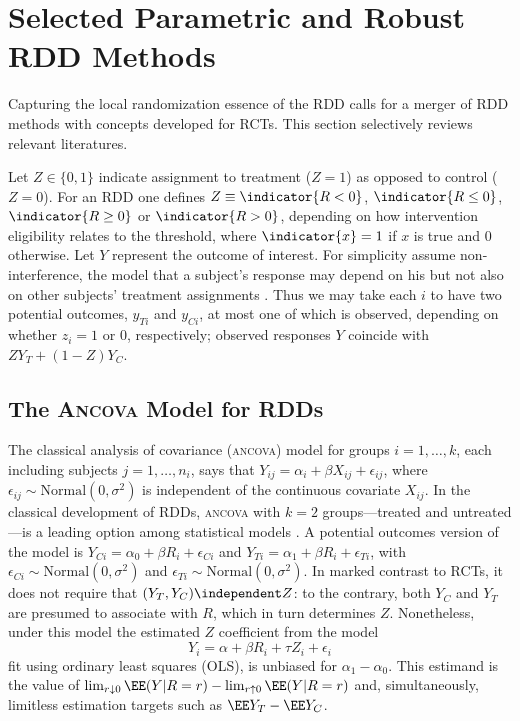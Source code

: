 \section{Selected Parametric and Robust RDD Methods}
Capturing the local randomization essence of the RDD calls for
a merger of RDD methods with concepts developed for RCTs. This
section selectively reviews relevant literatures.

Let $Z \in \{0,1\}$ indicate assignment to treatment ($Z=1$) as opposed to control
($Z=0$).  For an RDD one defines $Z \equiv \indicator{R< 0}$,
$\indicator{R \leq 0}$, $\indicator{R\geq 0}$ or $\indicator{R > 0}$,
depending on how intervention eligibility relates to the threshold,
where $\indicator{x}=1$ if $x$ is true and $0$ otherwise.
Let $Y$ represent the outcome of interest.
For simplicity assume non-interference, the model that
a subject's response may depend on his but not also on other subjects'
treatment assignments \citep{cox:1958,rubin:1978}.  Thus we may take each $i$
to have two potential outcomes, $y_{Ti}$ and $y_{Ci}$, at most one of which is observed, depending on whether $z_i=1$ or $0$, respectively;
 observed
responses $Y$ coincide with $ZY_{T}+(1-Z)Y_{C}$.

\subsection{The \textsc{Ancova} Model for RDDs}\label{sec:robust-analys-covar}

The classical analysis of covariance (\textsc{ancova}) model for
groups $i=1,\ldots, k$, each including subjects $j=1, \ldots, n_{i}$,
says that
$Y_{ij} = \alpha_{i} + \beta X_{ij} + \epsilon_{ij}$, where $\epsilon_{ij}
\sim \mathrm{Normal}(0, \sigma^{2})$ is independent of the continuous
covariate $X_{ij}$.
In the classical development of RDDs, \textsc{ancova} with $k=2$
groups---treated and untreated---is a leading option among statistical
models
\citep{thistlethwaite1960regression}.
A potential outcomes version of the model is
 $Y_{Ci} = \alpha_{0} + \beta R_{i} + \epsilon_{Ci}$ and
$Y_{Ti} = \alpha_{1}  + \beta R_{i} + \epsilon_{Ti}$, with
 $\epsilon_{Ci} \sim \mathrm{Normal}(0, \sigma^{2})$ and
 $\epsilon_{Ti} \sim \mathrm{Normal}(0, \sigma^{2})$.
In marked contrast to RCTs, it does
not require that $(Y_{T}, Y_{C}) \independent Z$: to the contrary, both
$Y_{C}$ and $Y_{T}$ are presumed to associate with $R$, which in turn
determines $Z$.
Nonetheless, under this model the estimated $Z$ coefficient from the
model
\begin{equation}\label{eq:classicOLS}
Y_i=\alpha+\beta R_i+\tau Z_i+\epsilon_i
\end{equation}
fit using ordinary least squares (OLS), is unbiased for
$\alpha_{1} - \alpha_{0}$.
This estimand is the value of  $\lim_{r\downarrow 0} \EE(Y | R=r) -
\lim_{r\uparrow 0} \EE(Y | R=r)$ and, simultaneously,
limitless estimation targets such as $\EE Y_{T}  - \EE Y_{C}$.

